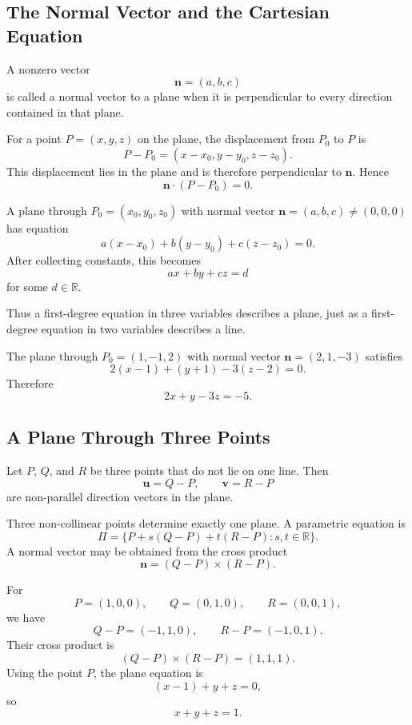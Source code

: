 \subsection{The Normal Vector and the Cartesian Equation}

A nonzero vector
\[
\mathbf{n}=(a,b,c)
\]
is called a normal vector to a plane when it is perpendicular to every direction
contained in that plane.

For a point $P=(x,y,z)$ on the plane, the displacement from $P_0$ to $P$ is
\[
P-P_0=(x-x_0,y-y_0,z-z_0).
\]
This displacement lies in the plane and is therefore perpendicular to
$\mathbf{n}$. Hence
\[
\mathbf{n}\cdot(P-P_0)=0.
\]

\begin{theorembox}
A plane through $P_0=(x_0,y_0,z_0)$ with normal vector
$\mathbf{n}=(a,b,c)\neq(0,0,0)$ has equation
\[
a(x-x_0)+b(y-y_0)+c(z-z_0)=0.
\]
After collecting constants, this becomes
\[
ax+by+cz=d
\]
for some $d\in\mathbb{R}$.
\end{theorembox}

Thus a first-degree equation in three variables describes a plane, just as a
first-degree equation in two variables describes a line.

\begin{examplebox}
The plane through $P_0=(1,-1,2)$ with normal vector
$\mathbf{n}=(2,1,-3)$ satisfies
\[
2(x-1)+(y+1)-3(z-2)=0.
\]
Therefore
\[
2x+y-3z=-5.
\]
\end{examplebox}

\subsection{A Plane Through Three Points}

Let $P$, $Q$, and $R$ be three points that do not lie on one line. Then
\[
\mathbf{u}=Q-P,
\qquad
\mathbf{v}=R-P
\]
are non-parallel direction vectors in the plane.

\begin{theorembox}
Three non-collinear points determine exactly one plane. A parametric equation is
\[
\Pi=\{P+s(Q-P)+t(R-P):s,t\in\mathbb{R}\}.
\]
A normal vector may be obtained from the cross product
\[
\mathbf{n}=(Q-P)\times(R-P).
\]
\end{theorembox}

\begin{examplebox}
For
\[
P=(1,0,0),
\qquad
Q=(0,1,0),
\qquad
R=(0,0,1),
\]
we have
\[
Q-P=(-1,1,0),
\qquad
R-P=(-1,0,1).
\]
Their cross product is
\[
(Q-P)\times(R-P)=(1,1,1).
\]
Using the point $P$, the plane equation is
\[
(x-1)+y+z=0,
\]
so
\[
x+y+z=1.
\]
\end{examplebox}

